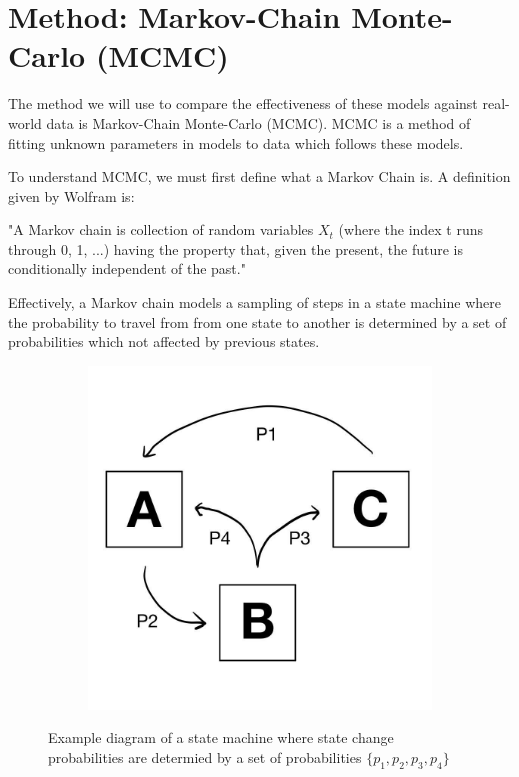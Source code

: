 \documentclass [letterpaper, 12pt] {article}
\begin{document}
\pagebreak

\section{Method: Markov-Chain Monte-Carlo (MCMC)}

The method we will use to compare the effectiveness of these models against real-world data is Markov-Chain Monte-Carlo (MCMC). MCMC is a method of fitting unknown parameters in models to data which follows these models.

To understand MCMC, we must first define what a Markov Chain is. A definition given by Wolfram is:

"A Markov chain is collection of random variables ${X_t}$ (where the index t runs through 0, 1, ...) having the property that, given the present, the future is conditionally independent of the past." \cite{weisstein}

Effectively, a Markov chain models a sampling of steps in a state machine where the probability to travel from from one state to another is determined by a set of probabilities which not affected by previous states.

\begin{figure}[H]
	\centering
	\begin{subfigure}{0.5\textwidth}
		\includegraphics[width=\textwidth]{state_machine.jpg}
	\end{subfigure}
	\caption{Example diagram of a state machine where state change probabilities are determied by a set of probabilities $\{p_1, p_2, p_3, p_4\}$} 
\end{figure}
\end{document}

